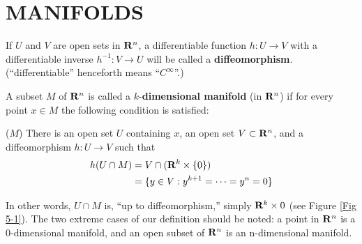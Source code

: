 \section{MANIFOLDS}
If $U$ and $V$ are open sets in $\mathbf{R}^n$, a differentiable function
$h: U\to V$ with a differentiable inverse $h^{-1}:V\to U$ will be called 
a \textbf{diffeomorphism}. (``differentiable'' henceforth means ``$C^\infty$''.)

A subset $M$ of $\mathbf{R}^n$ is called a $k$-\textbf{dimensional manifold} (in $\mathbf{R}^n$)
if for every point $x\in M$ the following condition is satisfied:

\vspace*{1em}
\noindent($M$) There is an open set $U$ containing $x$, an open set $V\subset \mathbf{R}^n$, and a 
diffeomorphism $h:U\to V$ such that
\begin{align*}
    h(U\cap M)
    & = V\cap (\mathbf{R}^k\times \{0\}) \\
    & = \{y\in V:y^{k+1}=\cdots=y^n=0\}
\end{align*}

In other words, $U\cap M$ is, ``up to diffeomorphism,'' simply
$\mathbf{R}^k\times{0}$ (see Figure \ref{Fig 5-1}). The two extreme cases of our
definition should be noted: a point in $\mathbf{R}^n$ is a 0-dimensional
manifold, and an open subset of $\mathbf{R}^n$ is an n-dimensional manifold.

